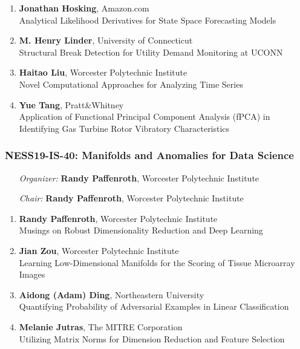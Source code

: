 \begin{enumerate}
\item \textbf{Jonathan Hosking}, Amazon.com \\
Analytical Likelihood Derivatives for State Space Forecasting Models
\item \textbf{M. Henry Linder}, University of Connecticut \\
Structural Break Detection for Utility Demand Monitoring at UCONN
\item \textbf{Haitao Liu}, Worcester Polytechnic Institute \\
Novel Computational Approaches for Analyzing Time Series
\item \textbf{Yue Tang}, Pratt\&Whitney \\
Application of Functional Principal Component Analysis (fPCA) in Identifying Gas Turbine Rotor Vibratory Characteristics
\end{enumerate}

\subsubsection*{NESS19-IS-40: Manifolds and Anomalies for Data Science}

\begin{enumerate}[align=left]
\item [\emph{Organizer:}] \textbf{Randy Paffenroth}, Worcester Polytechnic Institute \\
\item [\emph{Chair:}] \textbf{Randy Paffenroth}, Worcester Polytechnic Institute
\end{enumerate}

\begin{enumerate}
\item \textbf{Randy Paffenroth}, Worcester Polytechnic Institute \\
Musings on Robust Dimensionality Reduction and Deep Learning
\item \textbf{Jian Zou}, Worcester Polytechnic Institute \\
Learning Low-Dimensional Manifolds for the Scoring of Tissue Microarray Images
\item \textbf{Aidong (Adam) Ding}, Northeastern University \\
Quantifying Probability of Adversarial Examples in Linear Classification
\item \textbf{Melanie Jutras}, The MITRE Corporation \\
Utilizing Matrix Norms for Dimension Reduction and Feature Selection
\end{enumerate}

